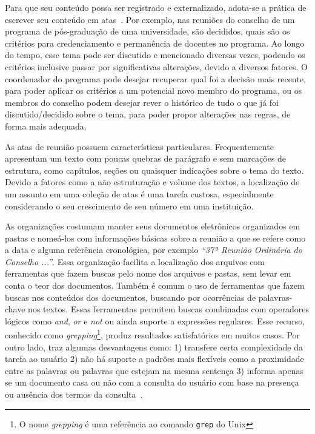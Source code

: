 Para que seu conteúdo possa ser registrado e externalizado, adota-se a prática de escrever seu conteúdo em atas~\cite{Miriam2013, Lee2011}. Por exemplo, nas reuniões do conselho de um programa de pós-graduação de uma universidade, são decididos, quais são os critérios para credenciamento e permanência de docentes no programa. Ao longo do tempo, esse tema pode ser discutido e mencionado diversas vezes, podendo os critérios inclusive passar por significativas alterações, devido a diversos fatores. O coordenador do programa pode desejar recuperar qual foi a decisão mais recente, para poder aplicar os critérios a um potencial novo membro do programa, ou os membros do conselho podem desejar rever o histórico de tudo o que já foi discutido/decidido sobre o tema, para poder propor alterações nas regras, de forma mais adequada.

As atas de reunião possuem características particulares. Frequentemente apresentam um texto com poucas quebras de parágrafo e sem marcações de estrutura, como capítulos, seções ou quaisquer indicações sobre o tema do texto. Devido a fatores como a não estruturação e volume dos textos, a localização de um assunto em uma coleção de atas é uma tarefa custosa, especialmente considerando o seu crescimento de seu número em uma instituição. 


As organizações costumam manter seus documentos eletrônicos organizados em pastas e nomeá-los com informações básicas sobre a reunião a que se refere como a data e alguma referência cronológica, por exemplo \textit{``37ª Reunião Ordinária do Conselho ...''}. Essa organização facilita a localização dos arquivos com ferramentas que fazem buscas pelo nome dos arquivos e pastas, sem levar em conta o teor dos documentos. 
%
Também é comum o uso de ferramentas que fazem buscas nos conteúdos dos documentos, buscando por ocorrências de palavras-chave nos textos. Essas ferramentas permitem buscas combinadas com operadores lógicos como \textit{and}, \textit{or} e \textit{not} ou ainda suporte a expressões regulares. Esse recurso, conhecido como \textit{grepping}\footnote{O nome \textit{grepping} é uma referência ao comando \texttt{grep} do Unix}, produz resultados satisfatórios em muitos casos. Por outro lado, traz algumas desvantagens como: 
1) transfere certa complexidade da tarefa ao usuário 
2) não há suporte a padrões mais flexíveis como a proximidade entre as palavras ou palavras que estejam na mesma sentença 
3) informa apenas se um documento casa ou não com a consulta do usuário com base na presença ou ausência dos termos da consulta~\cite{Aggarwal2012,Manning2008}. 
 


